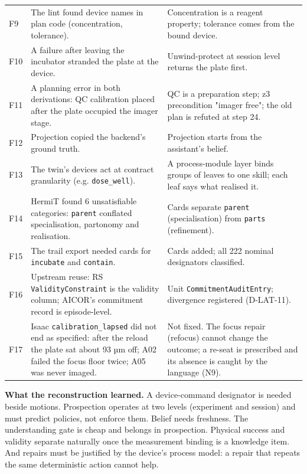 \documentclass[10pt,a4paper]{article}
\begin{document}
\begin{table}[tbp]
\begin{tabularx}{\linewidth}{lXX}
F9 & The lint found device names in plan code (concentration, tolerance). & Concentration is a reagent property; tolerance comes from the bound device. \\
F10 & A failure after leaving the incubator stranded the plate at the device. & Unwind-protect at session level returns the plate first. \\
F11 & A planning error in both derivations: QC calibration placed after the plate occupied the imager stage. & QC is a preparation step; z3 precondition "imager free"; the old plan is refuted at step 24. \\
F12 & Projection copied the backend's ground truth. & Projection starts from the assistant's belief. \\
F13 & The twin's devices act at contract granularity (e.g. \texttt{dose\_\allowbreak{}well}). & A process-module layer binds groups of leaves to one skill; each leaf says what realised it. \\
F14 & HermiT found 6 unsatisfiable categories: \texttt{parent} conflated specialisation, partonomy and realisation. & Cards separate \texttt{parent} (specialisation) from \texttt{parts} (refinement). \\
F15 & The trail export needed cards for \texttt{incubate} and \texttt{contain}. & Cards added; all 222 nominal designators classified. \\
F16 & Upstream reuse: RS \texttt{ValidityConstraint} is the validity column; AICOR's commitment record is episode-level. & Unit \texttt{CommitmentAuditEntry}; divergence registered (D-LAT-11). \\
F17 & Isaac \texttt{calibration\_\allowbreak{}lapsed} did not end as specified: after the reload the plate sat about 93 µm off; A02 failed the focus floor twice; A05 was never imaged. & Not fixed. The focus repair (refocus) cannot change the outcome; a re-seat is prescribed and its absence is caught by the language (N9). \\\bottomrule
\end{tabularx}
\end{table}

\textbf{What the reconstruction learned.} A device-command designator is needed beside motions. Prospection operates at two levels (experiment and session) and must predict policies, not enforce them. Belief needs freshness. The understanding gate is cheap and belongs in prospection. Physical success and validity separate naturally once the measurement binding is a knowledge item. And repairs must be justified by the device's process model: a repair that repeats the same deterministic action cannot help.
\end{document}
